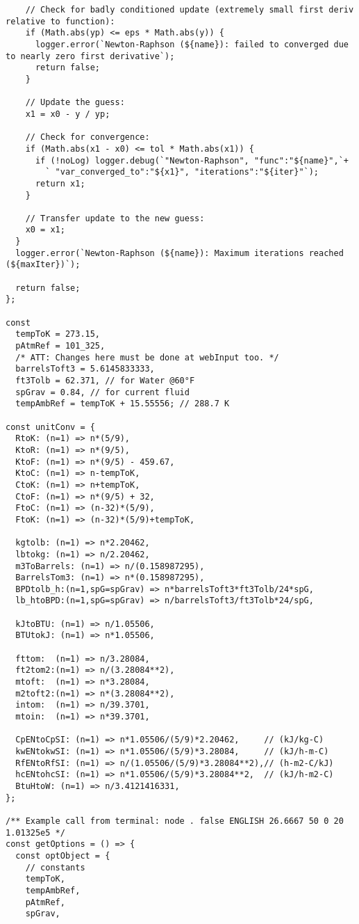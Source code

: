 \begin{verbatim}
    // Check for badly conditioned update (extremely small first deriv relative to function):
    if (Math.abs(yp) <= eps * Math.abs(y)) {
      logger.error(`Newton-Raphson (${name}): failed to converged due to nearly zero first derivative`);
      return false;
    }

    // Update the guess:
    x1 = x0 - y / yp;

    // Check for convergence:
    if (Math.abs(x1 - x0) <= tol * Math.abs(x1)) {
      if (!noLog) logger.debug(`"Newton-Raphson", "func":"${name}",`+
        ` "var_converged_to":"${x1}", "iterations":"${iter}"`);
      return x1;
    }

    // Transfer update to the new guess:
    x0 = x1;
  }
  logger.error(`Newton-Raphson (${name}): Maximum iterations reached (${maxIter})`);

  return false;
};

const 
  tempToK = 273.15,
  pAtmRef = 101_325,
  /* ATT: Changes here must be done at webInput too. */
  barrelsToft3 = 5.6145833333,
  ft3Tolb = 62.371, // for Water @60°F
  spGrav = 0.84, // for current fluid
  tempAmbRef = tempToK + 15.55556; // 288.7 K

const unitConv = {
  RtoK: (n=1) => n*(5/9),
  KtoR: (n=1) => n*(9/5),
  KtoF: (n=1) => n*(9/5) - 459.67,
  KtoC: (n=1) => n-tempToK,
  CtoK: (n=1) => n+tempToK,
  CtoF: (n=1) => n*(9/5) + 32,
  FtoC: (n=1) => (n-32)*(5/9),
  FtoK: (n=1) => (n-32)*(5/9)+tempToK,

  kgtolb: (n=1) => n*2.20462,
  lbtokg: (n=1) => n/2.20462,
  m3ToBarrels: (n=1) => n/(0.158987295),
  BarrelsTom3: (n=1) => n*(0.158987295),
  BPDtolb_h:(n=1,spG=spGrav) => n*barrelsToft3*ft3Tolb/24*spG,
  lb_htoBPD:(n=1,spG=spGrav) => n/barrelsToft3/ft3Tolb*24/spG,

  kJtoBTU: (n=1) => n/1.05506,
  BTUtokJ: (n=1) => n*1.05506,

  fttom:  (n=1) => n/3.28084,
  ft2tom2:(n=1) => n/(3.28084**2),
  mtoft:  (n=1) => n*3.28084,
  m2toft2:(n=1) => n*(3.28084**2),
  intom:  (n=1) => n/39.3701,
  mtoin:  (n=1) => n*39.3701,

  CpENtoCpSI: (n=1) => n*1.05506/(5/9)*2.20462,     // (kJ/kg-C)
  kwENtokwSI: (n=1) => n*1.05506/(5/9)*3.28084,     // (kJ/h-m-C)
  RfENtoRfSI: (n=1) => n/(1.05506/(5/9)*3.28084**2),// (h-m2-C/kJ)
  hcENtohcSI: (n=1) => n*1.05506/(5/9)*3.28084**2,  // (kJ/h-m2-C)
  BtuHtoW: (n=1) => n/3.4121416331,
};

/** Example call from terminal: node . false ENGLISH 26.6667 50 0 20 1.01325e5 */ 
const getOptions = () => {
  const optObject = {
    // constants
    tempToK,
    tempAmbRef,
    pAtmRef,
    spGrav,


\end{verbatim}
